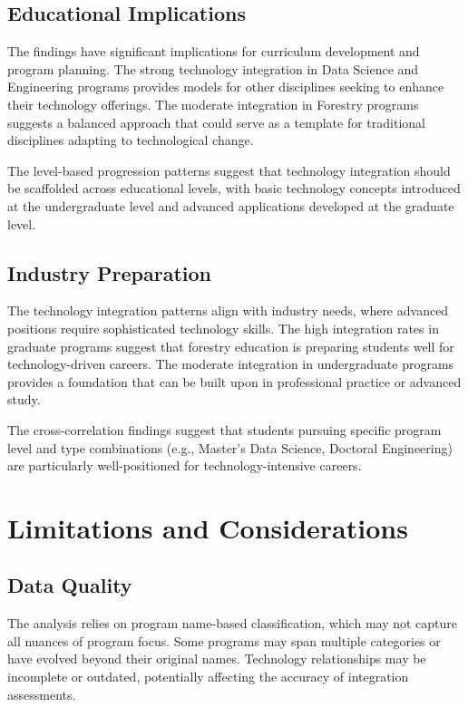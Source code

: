 \documentclass[12pt]{article}
\begin{document}
\subsection{Educational Implications}
The findings have significant implications for curriculum development and program planning. The strong technology integration in Data Science and Engineering programs provides models for other disciplines seeking to enhance their technology offerings. The moderate integration in Forestry programs suggests a balanced approach that could serve as a template for traditional disciplines adapting to technological change.

The level-based progression patterns suggest that technology integration should be scaffolded across educational levels, with basic technology concepts introduced at the undergraduate level and advanced applications developed at the graduate level.

\subsection{Industry Preparation}
The technology integration patterns align with industry needs, where advanced positions require sophisticated technology skills. The high integration rates in graduate programs suggest that forestry education is preparing students well for technology-driven careers. The moderate integration in undergraduate programs provides a foundation that can be built upon in professional practice or advanced study.

The cross-correlation findings suggest that students pursuing specific program level and type combinations (e.g., Master's Data Science, Doctoral Engineering) are particularly well-positioned for technology-intensive careers.

\section{Limitations and Considerations}

\subsection{Data Quality}
The analysis relies on program name-based classification, which may not capture all nuances of program focus. Some programs may span multiple categories or have evolved beyond their original names. Technology relationships may be incomplete or outdated, potentially affecting the accuracy of integration assessments.
\end{document}
